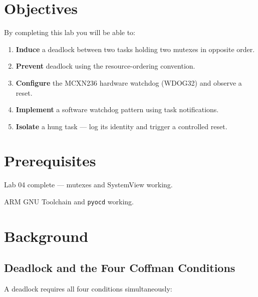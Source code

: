 \documentclass[11pt, a4paper]{article}
\begin{document}

\section{Objectives}

By completing this lab you will be able to:

\begin{enumerate}[noitemsep, leftmargin=*]
  \item \textbf{Induce} a deadlock between two tasks holding two mutexes in opposite
        order.
  \item \textbf{Prevent} deadlock using the resource-ordering convention.
  \item \textbf{Configure} the MCXN236 hardware watchdog (WDOG32) and observe a reset.
  \item \textbf{Implement} a software watchdog pattern using task notifications.
  \item \textbf{Isolate} a hung task --- log its identity and trigger a controlled reset.
\end{enumerate}

\section{Prerequisites}

\begin{checklist}
  \item Lab 04 complete --- mutexes and SystemView working.
  \item ARM GNU Toolchain and \texttt{pyocd} working.
\end{checklist}

\section{Background}

\subsection{Deadlock and the Four Coffman Conditions}

A deadlock requires all four conditions simultaneously:
\end{document}
